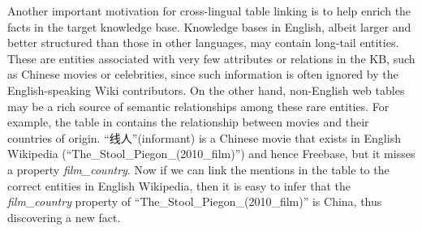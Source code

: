Another important motivation for cross-lingual table linking is to 
help enrich the facts in the target knowledge base. 
Knowledge bases in English,  albeit larger and better structured than those in other languages,
may contain long-tail entities. These are entities associated with very few attributes 
or relations in the KB, such as Chinese movies or celebrities, since such information is often
ignored by the English-speaking Wiki contributors.
On the other hand, non-English web tables may be a rich source of 
semantic relationships among these rare entities.
For example, the table in  contains the relationship between movies and
their countries of origin. ``线人''(informant) is a Chinese movie that exists in English Wikipedia
(``The\_Stool\_Piegon\_(2010\_film)'') and hence Freebase, but it misses a property 
{\em film\_country}. Now if we can link the mentions in the table to the correct entities in
English Wikipedia, then it is easy to infer that the {\em film\_country} property of 
``The\_Stool\_Piegon\_(2010\_film)'' is China, thus discovering a new fact. 


